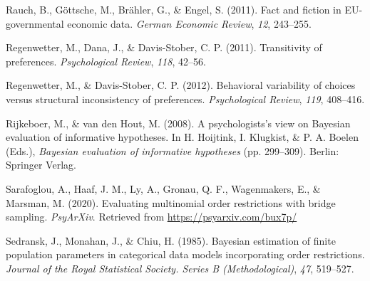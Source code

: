 \documentclass[
  english,
  man,floatsintext]{apa6}
\begin{document}
\leavevmode\hypertarget{ref-rauch2011fact}{}%
Rauch, B., Göttsche, M., Brähler, G., \& Engel, S. (2011). Fact and fiction in EU-governmental economic data. \emph{German Economic Review}, \emph{12}, 243--255.

\leavevmode\hypertarget{ref-regenwetter2011transitivity}{}%
Regenwetter, M., Dana, J., \& Davis-Stober, C. P. (2011). Transitivity of preferences. \emph{Psychological Review}, \emph{118}, 42--56.

\leavevmode\hypertarget{ref-regenwetter2012behavioral}{}%
Regenwetter, M., \& Davis-Stober, C. P. (2012). Behavioral variability of choices versus structural inconsistency of preferences. \emph{Psychological Review}, \emph{119}, 408--416.

\leavevmode\hypertarget{ref-rijkeboer2008psychologists}{}%
Rijkeboer, M., \& van den Hout, M. (2008). A psychologists's view on Bayesian evaluation of informative hypotheses. In H. Hoijtink, I. Klugkist, \& P. A. Boelen (Eds.), \emph{Bayesian evaluation of informative hypotheses} (pp. 299--309). Berlin: Springer Verlag.

\leavevmode\hypertarget{ref-sarafoglou2020evaluatingPreprint}{}%
Sarafoglou, A., Haaf, J. M., Ly, A., Gronau, Q. F., Wagenmakers, E., \& Marsman, M. (2020). Evaluating multinomial order restrictions with bridge sampling. \emph{PsyArXiv}. Retrieved from \url{https://psyarxiv.com/bux7p/}

\leavevmode\hypertarget{ref-sedransk1985bayesian}{}%
Sedransk, J., Monahan, J., \& Chiu, H. (1985). Bayesian estimation of finite population parameters in categorical data models incorporating order restrictions. \emph{Journal of the Royal Statistical Society. Series B (Methodological)}, \emph{47}, 519--527.

\endgroup


\clearpage
\makeatletter
\efloat@restorefloats
\makeatother
\end{document}
